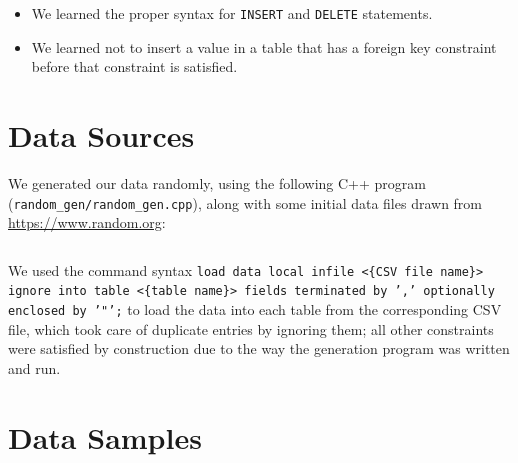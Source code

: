 \documentclass[american,extrafontsizes,12pt,portrait,letterpaper,oneside,onecolumn,final]{memoir}
\begin{document}
\begin{itemize}[leftmargin=*]
\item We learned the proper syntax for \texttt{INSERT} and \texttt{DELETE} statements.
\item We learned not to insert a value in a table that has a foreign key constraint before that constraint is satisfied.
\end{itemize}

\section{Data Sources}

We generated our data randomly, using the following C++ program (\texttt{random_gen/random_gen.cpp}), along with some initial data files drawn from \url{https://www.random.org}:

\inputminted[linenos,breaklines,breakbytokenanywhere]{c++}{../Part\ 5/random_gen/random_gen.cpp}

We used the command syntax \texttt{load data local infile <\textsf{\{CSV file name\}}> ignore into table <\textsf{\{table name\}}> fields terminated by ',' optionally enclosed by '"';} to load the data into each table from the corresponding CSV file, which took care of duplicate entries by ignoring them; all other constraints were satisfied by construction due to the way the generation program was written and run.

\section{Data Samples}
\end{document}
